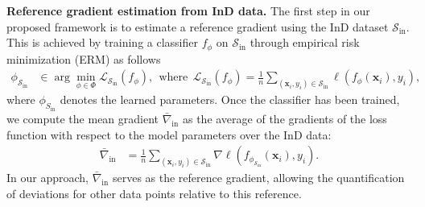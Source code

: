 \documentclass[10pt]{article} %
\theoremstyle{plain}
\theoremstyle{definition}
\begin{document}
\textbf{Reference gradient estimation from InD data.}
The first step in our proposed framework is to estimate a reference gradient using the InD dataset \( \mathcal{S}_{\text{in}} \). This is achieved by training a classifier \( f_{\phi} \) on \( \mathcal{S}_{\text{in}} \) through empirical risk minimization (ERM) as follows
\begin{align} \label{eq::InD_prob}
\phi_{\mathcal{S}_{\text{in}}} &\in \arg\min_{\phi \in \Phi} {\mathcal L}_{\mathcal{S}_{\text{in}}}(f_{\phi}), ~~
\text{where} ~~ {\mathcal L}_{\mathcal{S}_{\text{in}}}(f_{\phi}) = \frac{1}{n} \sum_{(\bm{x}_i, y_i) \in \mathcal{S}_{\text{in}}} \ell(f_{\phi}(\bm{x}_i), y_i),
\end{align}
where \( \phi_{S_{\text{in}}} \) denotes the learned parameters.
Once the classifier has been trained, we compute the mean gradient \( \bar{\nabla}_{\text{in}} \) as the average of the gradients of the loss function with respect to the model parameters over the InD data:
\begin{align}
\bar{\nabla}_{\text{in}} &= \frac{1}{n} \sum_{(\bm{x}_i, y_i) \in \mathcal{S}_{\text{in}}} \nabla \ell(f_{\phi_{\mathcal{S}_{\text{in}}}}(\bm{x}_i), y_i).
\end{align}
In our approach, \( \bar{\nabla}_{\text{in}} \) serves as the reference gradient, allowing the quantification of deviations for other data points relative to this reference.
\end{document}
